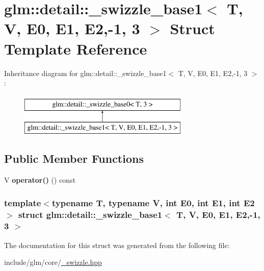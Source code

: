 \hypertarget{structglm_1_1detail_1_1__swizzle__base1_3_01T_00_01V_00_01E0_00_01E1_00_01E2_00-1_00_013_01_4}{\section{glm\-:\-:detail\-:\-:\-\_\-swizzle\-\_\-base1$<$ \-T, \-V, \-E0, \-E1, \-E2,-\/1, 3 $>$ \-Struct \-Template \-Reference}
\label{structglm_1_1detail_1_1__swizzle__base1_3_01T_00_01V_00_01E0_00_01E1_00_01E2_00-1_00_013_01_4}
}
\-Inheritance diagram for glm\-:\-:detail\-:\-:\-\_\-swizzle\-\_\-base1$<$ \-T, \-V, \-E0, \-E1, \-E2,-\/1, 3 $>$\-:\begin{figure}[H]
\begin{center}
\leavevmode
\includegraphics[height=2.000000cm]{structglm_1_1detail_1_1__swizzle__base1_3_01T_00_01V_00_01E0_00_01E1_00_01E2_00-1_00_013_01_4}
\end{center}
\end{figure}
\subsection*{\-Public \-Member \-Functions}
\begin{DoxyCompactItemize}
\item 
\hypertarget{structglm_1_1detail_1_1__swizzle__base1_3_01T_00_01V_00_01E0_00_01E1_00_01E2_00-1_00_013_01_4_a76abd8070d51fabf296fa625bfaa2302}{\-V {\bfseries operator()} () const }\label{structglm_1_1detail_1_1__swizzle__base1_3_01T_00_01V_00_01E0_00_01E1_00_01E2_00-1_00_013_01_4_a76abd8070d51fabf296fa625bfaa2302}

\end{DoxyCompactItemize}
\subsubsection*{template$<$typename T, typename V, int \-E0, int \-E1, int \-E2$>$ struct glm\-::detail\-::\-\_\-swizzle\-\_\-base1$<$ T, V, E0, E1, E2,-\/1, 3 $>$}



\-The documentation for this struct was generated from the following file\-:\begin{DoxyCompactItemize}
\item 
include/glm/core/\hyperlink{__swizzle_8hpp}{\-\_\-swizzle.\-hpp}\end{DoxyCompactItemize}
